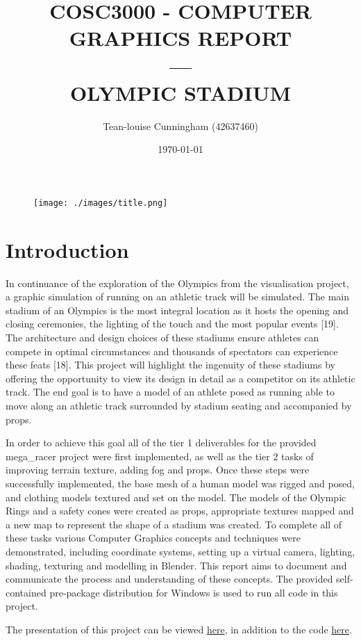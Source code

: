 \documentclass[a4 paper, 12pt]{article}
\title{COSC3000 - COMPUTER GRAPHICS REPORT \\ --- \\OLYMPIC STADIUM}
\author{Tean-louise Cunningham (42637460)}
\date{\today}
\begin{document}
\maketitle
    \begin{figure} [H]
        \centering
        \texttt{[image: ./images/title.png]}                  
    \end{figure}  


\pagebreak
\tableofcontents
\pagebreak
\listoffigures


\pagebreak
\section{Introduction}
In continuance of the exploration of the Olympics from the visualisation project, a graphic simulation of running on an athletic track will be simulated. The main stadium of an Olympics is the most integral location as it hosts the opening and closing ceremonies, the lighting of the touch and the most popular events [19]. The architecture and design choices of these stadiums ensure athletes can compete in optimal circumstances and thousands of spectators can experience these feats [18]. This project will highlight the ingenuity of these stadiums by offering the opportunity to view its design in detail as a competitor on its athletic track. The end goal is to have a model of an athlete posed as running able to move along an athletic track surrounded by stadium seating and accompanied by props. 

In order to achieve this goal all of the tier 1 deliverables for the provided mega\_racer project were first implemented, as well as the tier 2 tasks of improving terrain texture, adding fog and props. Once these steps were successfully implemented, the base mesh of a human model was rigged and posed, and clothing models textured and set on the model. The models of the Olympic Rings and a safety cones were created as props, appropriate textures mapped and a new map to represent the shape of a stadium was created. To complete all of these tasks various Computer Graphics concepts and techniques were demonstrated, including coordinate systems, setting up a virtual camera, lighting, shading, texturing and modelling in Blender. This report aims to document and communicate the process and understanding of these concepts. The provided self-contained pre-package distribution for Windows is used to run all code in this project.

The presentation of this project can be viewed \href{https://youtu.be/X3s_5GrY3Jw}{here}, in addition to the code \href{https://drive.google.com/drive/folders/13qEjRWL_FDgG3QQQaAF3BSkbr69Wab3i?usp=sharing}{here}.
\end{document}
